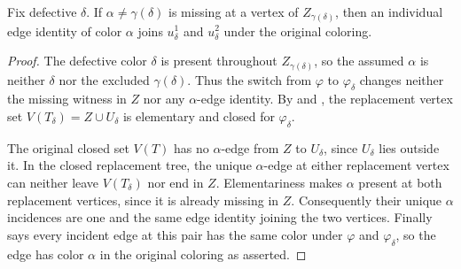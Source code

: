 \begin{lemma}
Fix defective $\delta$.  If
$\alpha\ne\gamma(\delta)$ is missing at a vertex of
$Z_{\gamma(\delta)}$, then an individual edge identity of color $\alpha$
joins $u^1_\delta$ and $u^2_\delta$ under the original coloring.
\end{lemma}
\begin{proof}
The defective color $\delta$ is present throughout
$Z_{\gamma(\delta)}$, so the assumed $\alpha$ is neither $\delta$ nor the
excluded $\gamma(\delta)$.  Thus the switch from $\varphi$ to
$\varphi_\delta$ changes neither the missing witness in $Z$ nor any
$\alpha$-edge identity.  By
 and
, the replacement vertex set
$V(T_\delta)=Z\cup U_\delta$ is elementary and closed for
$\varphi_\delta$.

The original closed set $V(T)$ has no $\alpha$-edge from $Z$ to
$U_\delta$, since $U_\delta$ lies outside it.  In the closed replacement
tree, the unique $\alpha$-edge at either replacement vertex can neither
leave $V(T_\delta)$ nor end in $Z$.  Elementariness makes $\alpha$ present
at both replacement vertices, since it is already missing in $Z$.
Consequently their unique $\alpha$ incidences are one and the same edge
identity joining the two vertices.  Finally
 says every incident edge at this
pair has the same color under $\varphi$ and $\varphi_\delta$, so the edge
has color $\alpha$ in the original coloring as asserted.
\end{proof}
